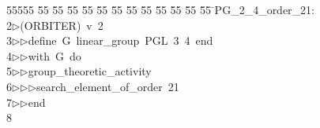 %
%
\begin{tabbing}
55555 \= 55 \= 55 \= 55 \= 55 \= 55 \= 55 \= 55 \= 55 \= 55 \= 55 \= 55 \= 55 \= \>PG\_2\_4\_order\_21:\\[0pt]
2\>$\triangleright$\>(ORBITER)\ v\ 2\ \\[0pt]
3\>$\triangleright$\>$\triangleright$\>define\ G\ linear\_group\ PGL\ 3\ 4\ end\ \\[0pt]
4\>$\triangleright$\>$\triangleright$\>with\ G\ do\ \\[0pt]
5\>$\triangleright$\>$\triangleright$\>group\_theoretic\_activity\ \\[0pt]
6\>$\triangleright$\>$\triangleright$\>$\triangleright$\>search\_element\_of\_order\ 21\ \\[0pt]
7\>$\triangleright$\>$\triangleright$\>end\\[0pt]
8\>\end{tabbing}
